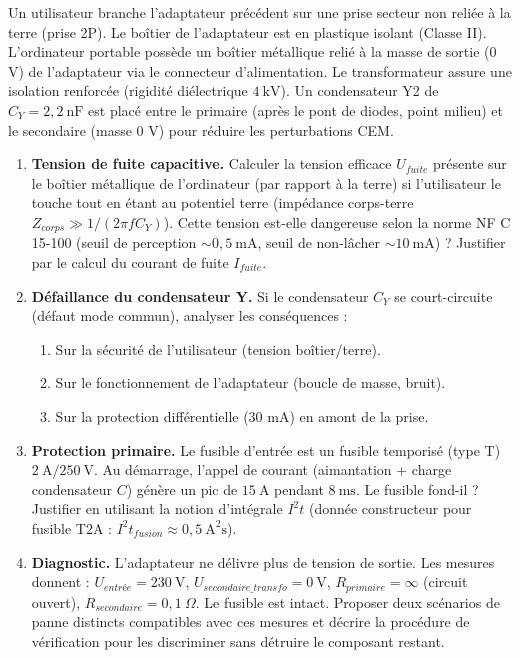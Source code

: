 \documentclass[11pt]{article}
\begin{document}
\begin{exercice}
Un utilisateur branche l'adaptateur précédent sur une prise secteur non reliée à la terre (prise 2P). Le boîtier de l'adaptateur est en plastique isolant (Classe II). L'ordinateur portable possède un boîtier métallique relié à la masse de sortie (0 V) de l'adaptateur via le connecteur d'alimentation. Le transformateur assure une isolation renforcée (rigidité diélectrique $4~\mathrm{kV}$). Un condensateur Y2 de $C_Y = 2,2~\mathrm{nF}$ est placé entre le primaire (après le pont de diodes, point milieu) et le secondaire (masse 0 V) pour réduire les perturbations CEM.
\begin{enumerate}
    \item \textbf{Tension de fuite capacitive.} Calculer la tension efficace $U_{fuite}$ présente sur le boîtier métallique de l'ordinateur (par rapport à la terre) si l'utilisateur le touche tout en étant au potentiel terre (impédance corps-terre $Z_{corps} \gg 1/(2\pi f C_Y)$). Cette tension est-elle dangereuse selon la norme NF C 15-100 (seuil de perception $\sim 0,5~\mathrm{mA}$, seuil de non-lâcher $\sim 10~\mathrm{mA}$) ? Justifier par le calcul du courant de fuite $I_{fuite}$.
    \item \textbf{Défaillance du condensateur Y.} Si le condensateur $C_Y$ se court-circuite (défaut mode commun), analyser les conséquences :
    \begin{enumerate}
        \item Sur la sécurité de l'utilisateur (tension boîtier/terre).
        \item Sur le fonctionnement de l'adaptateur (boucle de masse, bruit).
        \item Sur la protection différentielle (30 mA) en amont de la prise.
    \end{enumerate}
    \item \textbf{Protection primaire.} Le fusible d'entrée est un fusible temporisé (type T) $2~\mathrm{A} / 250~\mathrm{V}$. Au démarrage, l'appel de courant (aimantation + charge condensateur $C$) génère un pic de $15~\mathrm{A}$ pendant $8~\mathrm{ms}$. Le fusible fond-il ? Justifier en utilisant la notion d'intégrale $I^2t$ (donnée constructeur pour fusible T2A : $I^2t_{fusion} \approx 0,5~\mathrm{A^2s}$).
    \item \textbf{Diagnostic.} L'adaptateur ne délivre plus de tension de sortie. Les mesures donnent : $U_{entrée} = 230~\mathrm{V}$, $U_{secondaire\_transfo} = 0~\mathrm{V}$, $R_{primaire} = \infty$ (circuit ouvert), $R_{secondaire} = 0,1~\Omega$. Le fusible est intact. Proposer deux scénarios de panne distincts compatibles avec ces mesures et décrire la procédure de vérification pour les discriminer sans détruire le composant restant.
\end{enumerate}
\end{exercice}
\end{document}
